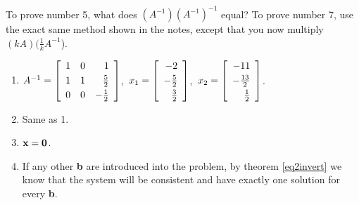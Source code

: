 \documentclass[12pt]{article}
\begin{document}
\begin{enumerate}
\begin{enumerate}
\end{enumerate}
\end{enumerate}

\bigskip

\noindent {\bf \ref{ssec.propinv}:}\\
\vspace{0.1\baselineskip}

 To prove number 5, what does
$(A^{-1})(A^{-1})^{-1}$ equal?  To prove number 7, use the exact
same method shown in the notes, except that you now multiply
$(kA)(\frac{1}{k}A^{-1}$).

\bigskip

\noindent {\bf \ref{ssec.syseinv}:}
\begin{enumerate}
\item $A^{-1}=\left [ \begin{array}{rrr}\vspace{1mm}
                                1&0&1\\ \vspace{1mm}
                                1&1&\frac{5}{2}\\
                                0&0&-\frac{1}{2} \end{array} \right
                                ]$,\  $x_1=\left [ \begin{array}{r}\vspace{1mm}
                                -2\\ \vspace{1mm}-\frac{5}{2}\\ \frac{3}{2}
                                \end{array} \right ]$,\ $x_2=\left [ \begin{array}{r} \vspace{1mm}
                                -11\\ \vspace{1mm} -\frac{13}{2}\\ \frac{1}{2}
                                \end{array} \right ]$.
\item Same as 1.

\item ${\bf x}={\bf 0}$.

\item If any other {\bf b} are introduced into the problem, by
theorem \ref{eq2invert} we know that the system will be consistent
and have exactly one solution for every {\bf b}.
\end{enumerate}
\end{document}
